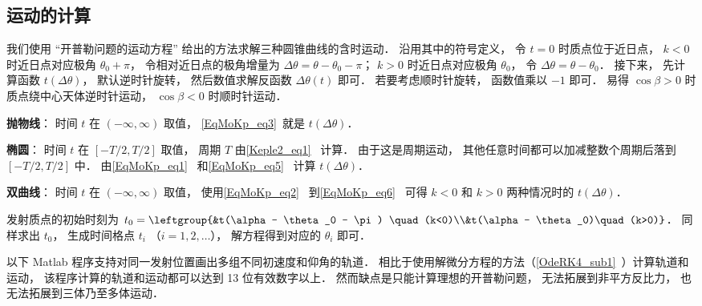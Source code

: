 \subsection{运动的计算}


我们使用 “开普勒问题的运动方程” 给出的方法求解三种圆锥曲线的含时运动． 沿用其中的符号定义， 令 $t=0$ 时质点位于近日点，  $k<0$ 时近日点对应极角 $\theta_0 + \pi$， 令相对近日点的极角增量为 $\Delta\theta = \theta - \theta_0 - \pi$； $k>0$ 时近日点对应极角 $\theta_0$， 令 $\Delta\theta = \theta - \theta_0$． 接下来， 先计算函数 $t(\Delta\theta)$， 默认逆时针旋转， 然后数值求解反函数 $\Delta\theta(t)$ 即可． 若要考虑顺时针旋转， 函数值乘以 $-1$ 即可． 易得 $\cos\beta > 0$ 时质点绕中心天体逆时针运动， $\cos\beta < 0$ 时顺时针运动．

\textbf{抛物线}： 时间 $t$ 在 $(-\infty,\infty)$ 取值， \autoref{EqMoKp_eq3}~就是 $t(\Delta\theta)$．

\textbf{椭圆}： 时间 $t$ 在 $[-T/2,T/2]$ 取值， 周期 $T$ 由\autoref{Keple2_eq1}~ 计算． 由于这是周期运动， 其他任意时间都可以加减整数个周期后落到 $[-T/2,T/2]$ 中． 由\autoref{EqMoKp_eq1}~ 和\autoref{EqMoKp_eq5}~ 计算 $t(\Delta\theta)$．

\textbf{双曲线}： 时间 $t$ 在 $(-\infty,\infty)$ 取值， 使用\autoref{EqMoKp_eq2}~ 到\autoref{EqMoKp_eq6}~ 可得 $k<0$ 和 $k>0$ 两种情况时的 $t(\Delta\theta)$．

发射质点的初始时刻为 $t_0 = \leftgroup{&t(\alpha - \theta_0 - \pi) \quad (k<0)\\&t(\alpha - \theta_0)\quad (k>0)}$． 同样求出 $t_0$， 生成时间格点 $t_i$ （$i=1,2,\dots$）， 解方程得到对应的 $\theta_i$ 即可．

以下 Matlab 程序支持对同一发射位置画出多组不同初速度和仰角的轨道． 相比于使用解微分方程的方法（\autoref{OdeRK4_sub1}~）计算轨道和运动， 该程序计算的轨道和运动都可以达到 13 位有效数字以上． 然而缺点是只能计算理想的开普勒问题， 无法拓展到非平方反比力， 也无法拓展到三体乃至多体运动．

